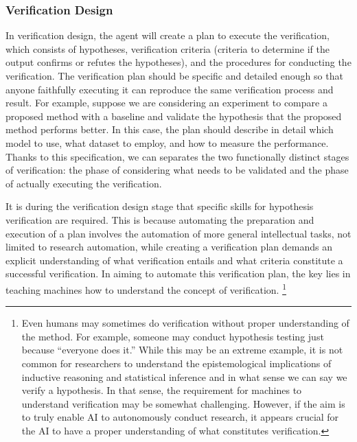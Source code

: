 \documentclass{book}
\begin{document}
\subsubsection{Verification Design} 
In verification design, the agent will create a plan to execute the verification, which consists of hypotheses, verification criteria (criteria to determine if the output confirms or refutes the hypotheses), and the procedures for conducting the verification. The verification plan should be specific and detailed enough so that anyone faithfully executing it can reproduce the same verification process and result. For example, suppose we are considering an experiment to compare a proposed method with a baseline and validate the hypothesis that the proposed method performs better. In this case, the plan should describe in detail which model to use, what dataset to employ, and how to measure the performance. Thanks to this specification, we can separates the two functionally distinct stages of verification: the phase of considering what needs to be validated and the phase of actually executing the verification.

It is during the verification design stage that specific skills for hypothesis verification are required. This is because automating the preparation and execution of a plan involves the automation of more general intellectual tasks, not limited to research automation, while creating a verification plan demands an explicit understanding of what verification entails and what criteria constitute a successful verification. In aiming to automate this verification plan, the key lies in teaching machines how to understand the concept of verification. \footnote{
Even humans may sometimes do verification without proper understanding of the method. For example, someone may conduct hypothesis testing just because ``everyone does it.'' While this may be an extreme example, it is not common for researchers to understand the epistemological implications of inductive reasoning and statistical inference and in what sense we can say we verify a hypothesis. In that sense, the requirement for machines to understand verification may be somewhat challenging. However, if the aim is to truly enable AI to autonomously conduct research, it appears crucial for the AI to have a proper understanding of what constitutes verification.
}

\end{document}
